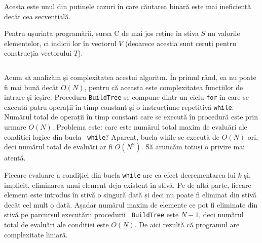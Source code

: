 Acesta este unul din puținele cazuri în care căutarea binară este mai
ineficientă decât cea secvențială.

Pentru ușurința programării, sursa C de mai jos reține în stiva $S$ nu
valorile elementelor, ci indicii lor în vectorul $V$ (deoarece aceștia sunt
ceruți pentru construcția vectorului $T$).

\inputminted{c}{src/problem17.c}

Acum să analizăm și complexitatea acestui algoritm. În primul rând, ea nu
poate fi mai bună decât $O(N)$, pentru că aceasta este complexitatea
funcțiilor de intrare și ieșire. Procedura {\tt BuildTree} se compune dintr-un
ciclu {\tt for} în care se execută patru operații în timp constant și o
instrucțiune repetitivă {\tt while}. Numărul total de operații în timp
constant care se execută în procedură este prin urmare $O(N)$. Problema este:
care este numărul total maxim de evaluări ale condiției logice din bucla {\tt
  while}? Aparent, bucla while se execută de $O(N)$ ori, deci numărul total de
evaluări ar fi $O(N^2)$. Să aruncăm totuși o privire mai atentă.

Fiecare evaluare a condiției din bucla {\tt while} are ca efect decrementarea
lui $k$ și, implicit, eliminarea unui element deja existent în stivă. Pe de
altă parte, fiecare element este introdus în stivă o singură dată și deci nu
poate fi eliminat din stivă decât cel mult o dată. Așadar numărul maxim de
elemente ce pot fi eliminate din stivă pe parcursul executării procedurii {\tt
  BuildTree} este $N-1$, deci numărul total de evaluări ale condiției este
$O(N)$. De aici rezultă că programul are complexitate liniară.
